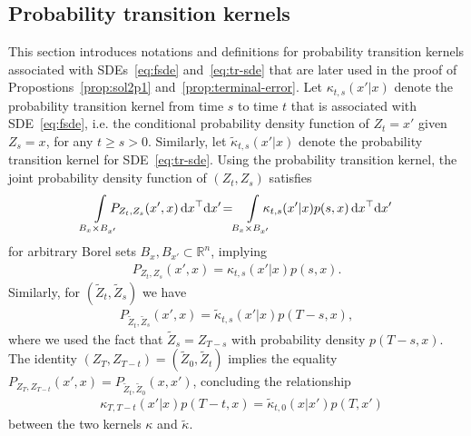 \documentclass[letterpaper, 10 pt, conference]{ieeeconf}  %
\def\R{\mathbb{R}}
\def\R{\mathbb{R}}
\newcommand{\ud}{\,\mathrm{d}}
\newcommand{\Ali}[1]{{\color{magenta}[Ali: #1]}}
\begin{document}
    \subsection{Probability transition kernels}\label{sec:kernel}
   This section introduces notations and definitions for probability transition kernels associated with SDEs~\eqref{eq:fsde} and~\eqref{eq:tr-sde} that are later used in the proof of Propostions~\ref{prop:sol2p1} and~\ref{prop:terminal-error}. 
    Let $\kappa_{t,s}(x'|x)$ denote the probability transition kernel from time $s$ to time $t$ that is associated with SDE~\eqref{eq:fsde},
i.e. the conditional probability density function of $Z_t=x'$ given $Z_s=x$, for any $t\geq s>0$. Similarly, let $\tilde \kappa_{t,s}(x'|x)$ denote the probability transition kernel for SDE~\eqref{eq:tr-sde}. Using the probability transition kernel, the joint probability density function of $(Z_t,Z_s)$ satisfies
\begin{align*}
\int\limits_{B_{x} \times B_{x'}} \hspace{-9pt}P_{Z_t,Z_s}(x',x) \ud x^\top \! \ud x'\! =\! \int\limits_{B_{x} \times B_{x'}} \hspace{-9pt}\kappa_{t,s}(x'|x) p(s,x) \ud x^\top \!\ud x'
\end{align*}
for arbitrary Borel sets $B_{x}, B_{x'} \subset \R^n$, implying   
\begin{align*}
     P_{Z_t,Z_s}(x',x) =  \kappa_{t,s}(x'|x) p(s,x).
\end{align*}
Similarly, for $(\tilde Z_t,\tilde Z_s)$ we have 
\begin{align*}
    P_{\tilde Z_t,\tilde Z_s}(x',x) =  \tilde \kappa_{t,s}(x'|x) p(T-s,x), 
\end{align*}
where we used the fact that $\tilde Z_s = Z_{T-s}$ with probability density $p(T-s,x)$. The identity $(Z_T,Z_{T-t})= (\tilde Z_0,\tilde Z_t)$ implies the equality $P_{Z_T,Z_{T-t}}(x',x)= P_{\tilde Z_{t},\tilde Z_0}(x,x')$, concluding the relationship 
\begin{align}\label{eq:kappa-identity}
   &\kappa_{T,T-t}(x'|x) p(T-t,x) = \tilde \kappa_{t,0}(x|x') p(T,x')
\end{align}
between the two kernels $\kappa$ and $\tilde \kappa$.
\end{document}
